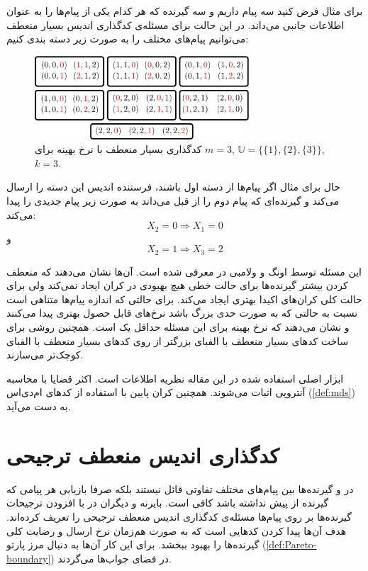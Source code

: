 برای مثال فرض کنید سه پیام داریم و سه گیرنده که هر کدام یکی از پیام‌ها را به عنوان اطلاعات جانبی می‌داند. در این حالت برای مسئله‌ی کدگذاری اندیس بسیار منعطف می‌توانیم پیام‌های مختلف را به صورت زیر دسته بندی کنیم:
\begin{figure}[H]
	\centering
	\includegraphics[width=8cm]{figs/chapter4/Alpha3}
	\caption[
	مثالی از کدگذاری بسیار منعطف با نرخ بهینه
	]{
		کدگذاری بسیار منعطف با نرخ بهینه برای
		$m=3$, 
		$\mathbb{U} = \big\{ \{1\}, \{2\}, \{3\} \big\}$,
		$k=3$.
	}
	\label{fig:eg:0}
\end{figure}
حال برای مثال اگر پیام‌ها از دسته اول باشند، فرستنده اندیس این دسته را ارسال می‌کند و گیرنده‌ای که پیام دوم را از قبل می‌داند به صورت زیر پیام جدیدی را پیدا می‌کند:
$$X_2 = 0 \Rightarrow X_1 = 0$$
و
$$X_2 = 1 \Rightarrow X_3 = 2$$


این مسئله توسط اونگ و ولامبی در
\cite{verypliable}
معرفی شده است. آن‌ها نشان می‌دهند که منعطف کردن بیشتر گیرنده‌ها برای حالت خطی هیچ بهبودی در کران ایجاد نمی‌کند ولی برای حالت کلی کران‌های اکیدا بهتری ایجاد می‌کند. برای حالتی که اندازه پیام‌ها متناهی است نسبت به حالتی که به صورت حدی بزرگ باشد نرخ‌های قابل حصول بهتری پیدا می‌کنند و  نشان می‌دهند که نرخ بهینه برای این مسئله حداقل یک است. همچنین روشی برای ساخت کدهای بسیار منعطف با الفبای بزرگتر از روی کدهای بسیار منعطف با الفبای کوچک‌تر می‌سازند.

ابزار اصلی استفاده شده در این مقاله نظریه اطلاعات است. اکثر قضایا با محاسبه آنتروپی اثبات می‌شوند. همچنین کران پایین با استفاده از
 کدهای ام‌دی‌اس (\autoref{def:mds}) به دست می‌آید.


\section{کدگذاری اندیس منعطف ترجیحی}
در 
\icod
 و 
 \picod
 گیرنده‌ها بین پیام‌های مختلف تفاوتی قائل نیستند بلکه صرفا بازیابی هر پیامی که گیرنده از پیش نداشته باشد کافی است. بایرنه و دیگران در
\cite{byrne2023preferential}
با افزودن ترجیحات گیرنده‌ها بر روی پیام‌ها مسئله‌ی کدگذاری اندیس منعطف ترجیحی را تعریف کرده‌اند. هدف آن‌ها پیدا کردن کدهایی است که به صورت هم‌زمان نرخ ارسال و رضایت کلی گیرنده‌ها را بهبود ببخشد. برای این کار آن‌ها به دنبال مرز پارتو (\autoref{def:Pareto-boundary})
 در فضای جواب‌ها می‌گردند.
 
